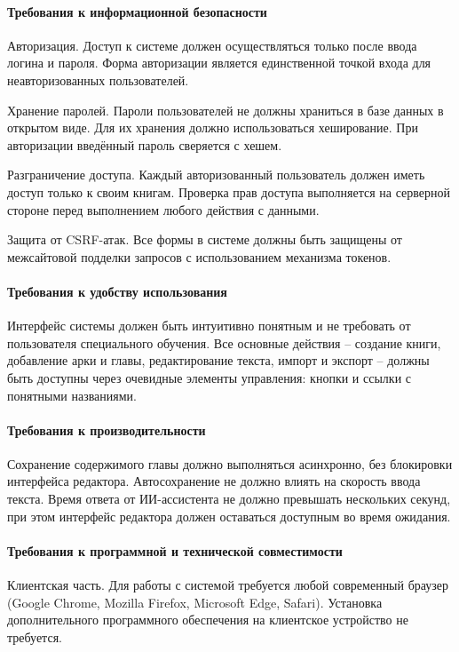 \paragraph{Требования к информационной безопасности}

Авторизация. Доступ к системе должен осуществляться только после ввода логина и пароля. Форма авторизации является единственной точкой входа для неавторизованных пользователей.

Хранение паролей. Пароли пользователей не должны храниться в базе данных в открытом виде. Для их хранения должно использоваться хеширование. При авторизации введённый пароль сверяется с хешем.

Разграничение доступа. Каждый авторизованный пользователь должен иметь доступ только к своим книгам. Проверка прав доступа выполняется на серверной стороне перед выполнением любого действия с данными.

Защита от CSRF-атак. Все формы в системе должны быть защищены от межсайтовой подделки запросов с использованием механизма токенов.

\paragraph{Требования к удобству использования}

Интерфейс системы должен быть интуитивно понятным и не требовать от пользователя специального обучения. Все основные действия -- создание книги, добавление арки и главы, редактирование текста, импорт и экспорт -- должны быть доступны через очевидные элементы управления: кнопки и ссылки с понятными названиями.

\paragraph{Требования к производительности}

Сохранение содержимого главы должно выполняться асинхронно, без блокировки интерфейса редактора. Автосохранение не должно влиять на скорость ввода текста. Время ответа от ИИ-ассистента не должно превышать нескольких секунд, при этом интерфейс редактора должен оставаться доступным во время ожидания.

\paragraph{Требования к программной и технической совместимости}

Клиентская часть. Для работы с системой требуется любой современный браузер (Google Chrome, Mozilla Firefox, Microsoft Edge, Safari). Установка дополнительного программного обеспечения на клиентское устройство не требуется.


